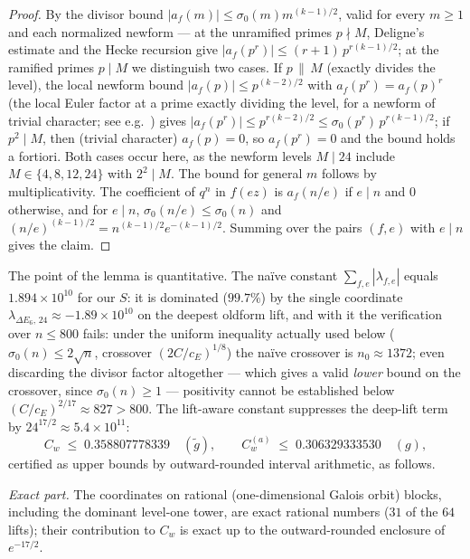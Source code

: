 \documentclass[11pt]{article}
\theoremstyle{remark}
\begin{document}
\begin{proof}
By the divisor bound $|a_f(m)|\le\sigma_0(m)m^{(k-1)/2}$, valid for
every $m\ge1$ and each normalized newform --- at the unramified primes
$p\nmid M$, Deligne's estimate and the Hecke recursion give
$|a_f(p^r)|\le(r+1)\,p^{r(k-1)/2}$; at the ramified primes $p\mid M$ we
distinguish two cases. If $p\,\|\,M$ (exactly divides the level), the
local newform bound $|a_f(p)|\le p^{(k-2)/2}$ with $a_f(p^r)=a_f(p)^r$
(the local Euler factor at a prime exactly dividing the level, for a
newform of trivial character; see e.g.\ \cite[\S5.8]{DiamondShurman})
gives $|a_f(p^r)|\le p^{r(k-2)/2}\le\sigma_0(p^r)\,p^{r(k-1)/2}$; if
$p^2\mid M$, then (trivial character) $a_f(p)=0$, so $a_f(p^r)=0$ and the
bound holds a fortiori. Both cases occur here, as the newform levels
$M\mid 24$ include $M\in\{4,8,12,24\}$ with $2^2\mid M$. The
bound for general $m$ follows by multiplicativity. The coefficient of $q^n$ in $f(ez)$ is $a_f(n/e)$
if $e\mid n$ and $0$ otherwise, and for $e\mid n$,
$\sigma_0(n/e)\le\sigma_0(n)$ and
$(n/e)^{(k-1)/2}=n^{(k-1)/2}e^{-(k-1)/2}$. Summing over the pairs
$(f,e)$ with $e\mid n$ gives the claim.
\end{proof}

The point of the lemma is quantitative. The na\"ive constant
$\sum_{f,e}|\lambda_{f,e}|$ equals $1.894\times10^{10}$ for our $S$:
it is dominated ($99.7\%$) by the single coordinate
$\lambda_{\Delta E_6,\,24}\approx-1.89\times10^{10}$ on the deepest
oldform lift, and with it the verification over $n\le800$ fails: under
the uniform inequality actually used below
($\sigma_0(n)\le2\sqrt n$, crossover $(2C/c_E)^{1/8}$) the na\"ive
crossover is $n_0\approx1372$; even discarding the divisor factor
altogether --- which gives a valid \emph{lower} bound on the crossover,
since $\sigma_0(n)\ge1$ --- positivity cannot be established below
$(C/c_E)^{2/17}\approx827>800$. The lift-aware constant suppresses the
deep-lift term by $24^{17/2}\approx5.4\times10^{11}$:
\begin{equation}\label{eq:Cw}
C_w \;\le\; 0.358807778339 \quad(\tilde g),
\qquad
C_w^{(a)} \;\le\; 0.306329333530 \quad(g),
\end{equation}
certified as upper bounds by outward-rounded interval arithmetic, as
follows.

\emph{Exact part.} The coordinates on rational (one-dimensional Galois
orbit) blocks, including the dominant level-one tower, are exact
rational numbers ($31$ of the $64$ lifts); their contribution to $C_w$
is exact up to the outward-rounded enclosure of $e^{-17/2}$.
\end{document}
